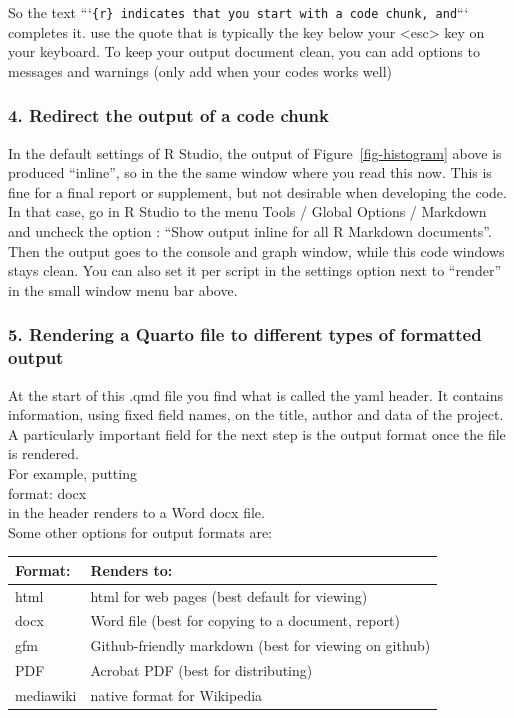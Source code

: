\documentclass[
  letterpaper,
  DIV=11,
  numbers=noendperiod]{scrartcl}
\begin{document}
So the text
```\texttt{\{r\}\ indicates\ that\ you\ start\ with\ a\ code\ chunk,\ and}```
completes it. use the quote that is typically the key below your
\textless esc\textgreater{} key on your keyboard. To keep your output
document clean, you can add options to messages and warnings (only add
when your codes works well)

\subsubsection{4. Redirect the output of a code
chunk}\label{redirect-the-output-of-a-code-chunk}

In the default settings of R Studio, the output of
Figure~\ref{fig-histogram} above is produced ``inline'', so in the the
same window where you read this now. This is fine for a final report or
supplement, but not desirable when developing the code. In that case, go
in R Studio to the menu Tools / Global Options / Markdown and uncheck
the option : ``Show output inline for all R Markdown documents''.\\
Then the output goes to the console and graph window, while this code
windows stays clean. You can also set it per script in the settings
option next to ``render'' in the small window menu bar above.

\subsubsection{5. Rendering a Quarto file to different types of
formatted
output}\label{rendering-a-quarto-file-to-different-types-of-formatted-output}

At the start of this .qmd file you find what is called the yaml header.
It contains information, using fixed field names, on the title, author
and data of the project.\\
A particularly important field for the next step is the output format
once the file is rendered.\\
For example, putting\\
format: docx\\
in the header renders to a Word docx file.\\
Some other options for output formats are:

\begin{longtable}[]{@{}ll@{}}
\toprule\noalign{}
Format: & Renders to: \\
\midrule\noalign{}
\endhead
\bottomrule\noalign{}
\endlastfoot
html & html for web pages (best default for viewing) \\
docx & Word file (best for copying to a document, report) \\
gfm & Github-friendly markdown (best for viewing on github) \\
PDF & Acrobat PDF (best for distributing) \\
mediawiki & native format for Wikipedia \\
\end{longtable}
\end{document}
